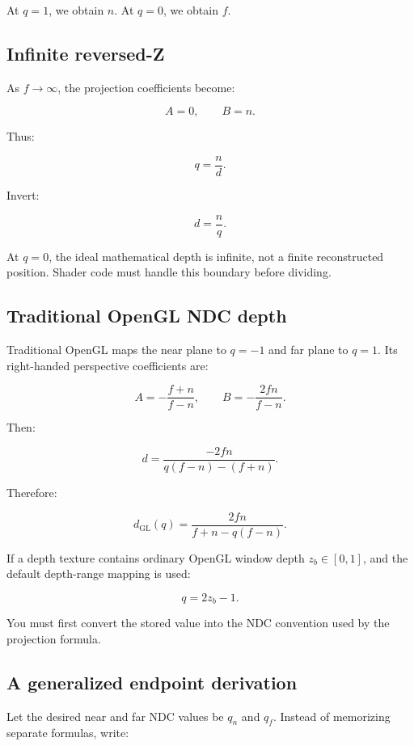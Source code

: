 At \(q=1\), we obtain \(n\). At \(q=0\), we obtain \(f\).

\subsection{Infinite reversed-Z}\label{02-foundations-ii-ch035-infinite-reversed-z}

As \(f\to\infty\), the projection coefficients become:

\[ A=0,\qquad B=n. \]

Thus:

\[ q=\frac nd. \]

Invert:

\[ \boxed{ d=\frac nq. } \]

At \(q=0\), the ideal mathematical depth is infinite, not a finite reconstructed position. Shader code must handle this boundary before dividing.

\subsection{Traditional OpenGL NDC depth}\label{02-foundations-ii-ch035-traditional-opengl-ndc-depth}

Traditional OpenGL maps the near plane to \(q=-1\) and far plane to \(q=1\). Its right-handed perspective coefficients are:

\[ A=-\frac{f+n}{f-n}, \qquad B=-\frac{2fn}{f-n}. \]

Then:

\[ d= \frac{-2fn} {q(f-n)-(f+n)}. \]

Therefore:

\[ \boxed{ d_{\mathrm{GL}}(q)= \frac{2fn}{f+n-q(f-n)}. } \]

If a depth texture contains ordinary OpenGL window depth \(z_b\in[0,1]\), and the default depth-range mapping is used:

\[ q=2z_b-1. \]

You must first convert the stored value into the NDC convention used by the projection formula.

\subsection{A generalized endpoint derivation}\label{02-foundations-ii-ch035-a-generalized-endpoint-derivation}

Let the desired near and far NDC values be \(q_n\) and \(q_f\). Instead of memorizing separate formulas, write:

